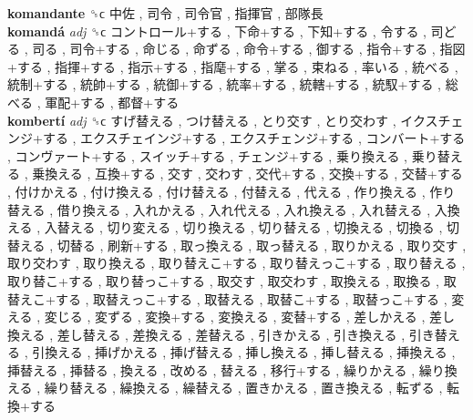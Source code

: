 \textbf{komandante} ␝ϲ   中佐 ,  司令 ,  司令官 ,  指揮官 ,  部隊長   \\
\textbf{komandá} \emph{adj}  ␝ϲ   コントロール+する ,  下命+する ,  下知+する ,  令する ,  司どる ,  司る ,  司令+する ,  命じる ,  命ずる ,  命令+する ,  御する ,  指令+する ,  指図+する ,  指揮+する ,  指示+する ,  指麾+する ,  掌る ,  束ねる ,  率いる ,  統べる ,  統制+する ,  統帥+する ,  統御+する ,  統率+する ,  統轄+する ,  統馭+する ,  総べる ,  軍配+する ,  都督+する   \\
\textbf{kombertí} \emph{adj}  ␝ϲ   すげ替える ,  つけ替える ,  とり交す ,  とり交わす ,  イクスチェンジ+する ,  エクスチェインジ+する ,  エクスチェンジ+する ,  コンバート+する ,  コンヴァート+する ,  スイッチ+する ,  チェンジ+する ,  乗り換える ,  乗り替える ,  乗換える ,  互換+する ,  交す ,  交わす ,  交代+する ,  交換+する ,  交替+する ,  付けかえる ,  付け換える ,  付け替える ,  付替える ,  代える ,  作り換える ,  作り替える ,  借り換える ,  入れかえる ,  入れ代える ,  入れ換える ,  入れ替える ,  入換える ,  入替える ,  切り変える ,  切り換える ,  切り替える ,  切換える ,  切換る ,  切替える ,  切替る ,  刷新+する ,  取っ換える ,  取っ替える ,  取りかえる ,  取り交す ,  取り交わす ,  取り換える ,  取り替えこ+する ,  取り替えっこ+する ,  取り替える ,  取り替こ+する ,  取り替っこ+する ,  取交す ,  取交わす ,  取換える ,  取換る ,  取替えこ+する ,  取替えっこ+する ,  取替える ,  取替こ+する ,  取替っこ+する ,  変える ,  変じる ,  変ずる ,  変換+する ,  変換える ,  変替+する ,  差しかえる ,  差し換える ,  差し替える ,  差換える ,  差替える ,  引きかえる ,  引き換える ,  引き替える ,  引換える ,  挿げかえる ,  挿げ替える ,  挿し換える ,  挿し替える ,  挿換える ,  挿替える ,  挿替る ,  換える ,  改める ,  替える ,  移行+する ,  繰りかえる ,  繰り換える ,  繰り替える ,  繰換える ,  繰替える ,  置きかえる ,  置き換える ,  転ずる ,  転換+する   \\
